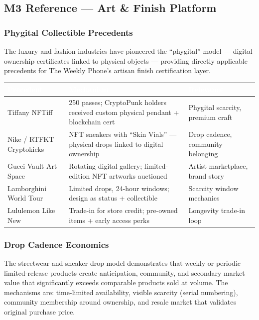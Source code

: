 \documentclass[11pt,letterpaper]{article}
\newcommand{\tableheader}[1]{\textbf{\sffamily\textcolor{white}{#1}}}
\begin{document}
\subsection{M3 Reference --- Art \& Finish Platform}

\subsubsection{Phygital Collectible Precedents}

The luxury and fashion industries have pioneered the ``phygital'' model --- digital ownership certificates linked to physical objects --- providing directly applicable precedents for The Weekly Phone's artisan finish certification layer.

\begin{center}
\begin{tabularx}{\textwidth}{L{3cm}XL{3cm}}
\toprule
{}
\tableheader{Precedent} & \tableheader{Mechanism} & \tableheader{Relevance} \\
\midrule
Tiffany NFTiff & 250 passes; CryptoPunk holders received custom physical pendant + blockchain cert & Phygital scarcity, premium craft \\
Nike / RTFKT Cryptokicks & NFT sneakers with ``Skin Vials'' --- physical drops linked to digital ownership & Drop cadence, community belonging \\
Gucci Vault Art Space & Rotating digital gallery; limited-edition NFT artworks auctioned & Artist marketplace, brand story \\
Lamborghini World Tour & Limited drops, 24-hour windows; design as status + collectible & Scarcity window mechanics \\
Lululemon Like New & Trade-in for store credit; pre-owned items + early access perks & Longevity trade-in loop \\
\bottomrule
\end{tabularx}
\end{center}

\subsubsection{Drop Cadence Economics}

The streetwear and sneaker drop model demonstrates that weekly or periodic limited-release products create anticipation, community, and secondary market value that significantly exceeds comparable products sold at volume. The mechanisms are: time-limited availability, visible scarcity (serial numbering), community membership around ownership, and resale market that validates original purchase price.
\end{document}
